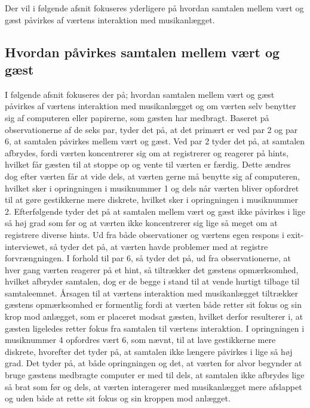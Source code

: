 Der vil i følgende afsnit fokuseres yderligere på hvordan samtalen mellem vært og gæst påvirkes af værtens interaktion med musikanlægget.
%
\subsection{Hvordan påvirkes samtalen mellem vært og gæst}
\label{TestresultaterSocialAcceptSamtale}
%
I følgende afsnit fokuseres der på; hvordan samtalen mellem vært og gæst påvirkes af værtens interaktion med musikanlægget og om værten selv benytter sig af computeren eller papirerne, som gæsten har medbragt. \blankline
%
Baseret på observationerne af de seks par, tyder det på, at det primært er ved par 2 og par 6, at samtalen påvirkes mellem vært og gæst. Ved par 2 tyder det på, at samtalen afbrydes, fordi værten koncentrerer sig om at registrerer og reagerer på hints, hvilket får gæsten til at stoppe op og vente til værten er færdig. Dette ændres dog efter værten får at vide dels, at værten gerne må benytte sig af computeren, hvilket sker i opringningen i musiknummer 1 og dels når værten bliver opfordret til at gøre gestikkerne mere diskrete, hvilket sker i opringningen i musiknummer 2. Efterfølgende tyder det på at samtalen mellem vært og gæst ikke påvirkes i lige så høj grad som før og at værten ikke koncentrerer sig lige så meget om at registrere diverse hints. Ud fra både observationer og værtens egen respons i exit-interviewet, så tyder det på, at værten havde problemer med at registre forvrængningen. I forhold til par 6, så tyder det på, ud fra observationerne, at hver gang værten reagerer på et hint, så tiltrækker det gæstens opmærksomhed, hvilket afbryder samtalen, dog er de begge i stand til at vende hurtigt tilbage til samtaleemnet. Årsagen til at værtens interaktion med musikanlægget tiltrækker gæstens opmærksomhed er formentlig fordi at værten både retter sit fokus og sin krop mod anlægget, som er placeret modsat gæsten, hvilket derfor resulterer i, at gæsten ligeledes retter fokus fra samtalen til værtens interaktion. I opringningen i musiknummer 4 opfordres vært 6, som nævnt, til at lave gestikkerne mere diskrete, hvorefter det tyder på, at samtalen ikke længere påvirkes i lige så høj grad. Det tyder på, at både opringningen og det, at værten for alvor begynder at bruge gæstens medbragte computer er med til dels, at samtalen ikke afbrydes lige så brat som før og dels, at værten interagerer med musikanlægget mere afslappet og uden både at rette sit fokus og sin kroppen mod anlægget.

